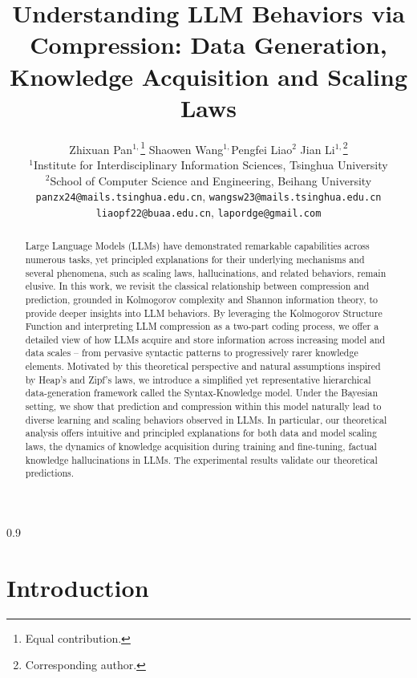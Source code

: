 \documentclass[11pt]{article}
\title{Understanding LLM Behaviors via Compression: 
Data Generation, Knowledge Acquisition and Scaling Laws}
\author{%
  Zhixuan Pan$^{1,}$\thanks{Equal contribution.} \quad Shaowen Wang$^{1,}$\footnotemark[1] \quad Pengfei Liao$^{2}$ \quad Jian Li$^{1,}$\thanks{Corresponding author.} \\
  $^{1}$Institute for Interdisciplinary Information Sciences, Tsinghua University \\
  $^{2}$School of Computer Science and Engineering, Beihang University \\
  \texttt{panzx24@mails.tsinghua.edu.cn}, \texttt{wangsw23@mails.tsinghua.edu.cn} \\ \texttt{liaopf22@buaa.edu.cn}, \texttt{lapordge@gmail.com}
}
\theoremstyle{plain}
\theoremstyle{definition}
\begin{document}

\maketitle


\begin{abstract}
Large Language Models (LLMs) have demonstrated remarkable capabilities across numerous tasks, yet principled explanations for their underlying mechanisms and several phenomena, such as scaling laws, hallucinations, and related behaviors, remain elusive. In this work, we revisit the classical relationship between compression and prediction, grounded in Kolmogorov complexity and Shannon information theory, to provide deeper insights into LLM behaviors. By leveraging the Kolmogorov Structure Function and interpreting LLM compression as a two-part coding process, we offer a detailed view of how LLMs acquire and store information across increasing model and data scales -- from pervasive syntactic patterns to progressively rarer knowledge elements. Motivated by this theoretical perspective and natural assumptions inspired by Heap’s and Zipf’s laws, we introduce a simplified yet representative hierarchical data-generation framework called the Syntax-Knowledge model. Under the Bayesian setting, we show that prediction and compression within this model naturally lead to diverse learning and scaling behaviors observed in LLMs. In particular, our theoretical analysis offers intuitive and principled explanations for both data and model scaling laws, the dynamics of knowledge acquisition during training and fine-tuning, factual knowledge hallucinations in LLMs. The experimental results validate our theoretical predictions.
\end{abstract}
\newpage
\begin{spacing}{0.9} 
    \tableofcontents
\end{spacing}
\newpage



\section{Introduction}

\end{document}
